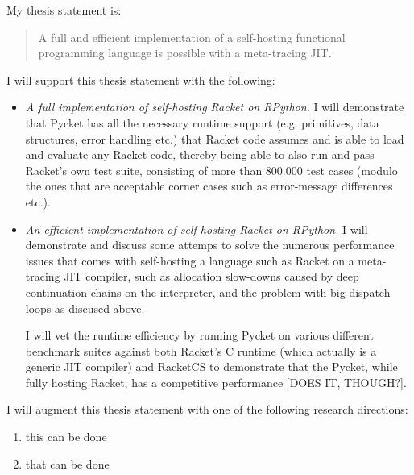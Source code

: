My thesis statement is:

\begin{quote}
  A full and efficient implementation of a self-hosting functional
  programming language is possible with a meta-tracing JIT.
\end{quote}

I will support this thesis statement with the following:

\begin{itemize}
  \item \textit{A full implementation of self-hosting Racket on
    RPython.} I will demonstrate that Pycket has all the necessary
    runtime support (e.g. primitives, data structures, error handling
    etc.)  that Racket code assumes and is able to load and evaluate
    any Racket code, thereby being able to also run and pass Racket's
    own test suite, consisting of more than 800.000 test cases (modulo
    the ones that are acceptable corner cases such as error-message
    differences etc.).
  \item \textit{An efficient implementation of self-hosting Racket on
    RPython.} I will demonstrate and discuss some attemps to solve the
    numerous performance issues that comes with self-hosting a
    language such as Racket on a meta-tracing JIT compiler, such as
    allocation slow-downs caused by deep continuation chains on the
    interpreter, and the problem with big dispatch loops as discused
    above.


    I will vet the runtime efficiency by running Pycket on various
    different benchmark suites against both Racket's C runtime (which
    actually is a generic JIT compiler) and RacketCS to demonstrate
    that the Pycket, while fully hosting Racket, has a competitive
    performance [DOES IT, THOUGH?].
\end{itemize}

I will augment this thesis statement with one of the following research directions:

\begin{enumerate}
  \item this can be done
  \item that can be done
\end{enumerate}
